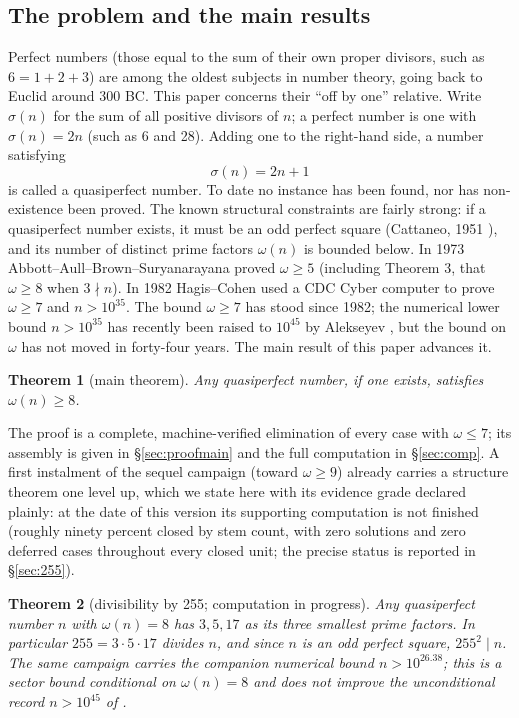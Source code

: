\documentclass[11pt]{article}
\newtheorem{theorem}{Theorem}
\theoremstyle{remark}
\begin{document}
\subsection{The problem and the main results}

Perfect numbers (those equal to the sum of their own proper divisors, such as $6 = 1 + 2 + 3$) are among the oldest subjects in number theory, going back to Euclid around 300 BC. This paper concerns their ``off by one'' relative. Write $\sigma(n)$ for the sum of all positive divisors of $n$; a perfect number is one with $\sigma(n) = 2n$ (such as 6 and 28). Adding one to the right-hand side, a number satisfying
\[ \sigma(n) = 2n + 1
\] is called a quasiperfect number. To date no instance has been found, nor has non-existence been proved. The known structural constraints are fairly strong: if a quasiperfect number exists, it must be an odd perfect square (Cattaneo, 1951 \cite{cattaneo}), and its number of distinct prime factors $\omega(n)$ is bounded below. In 1973 Abbott--Aull--Brown--Suryanarayana \cite{abbott} proved $\omega \ge 5$ (including Theorem 3, that $\omega \ge 8$ when $3 \nmid n$). In 1982 Hagis--Cohen \cite{hagiscohen} used a CDC Cyber computer to prove $\omega \ge 7$ and $n > 10^{35}$. The bound $\omega \ge 7$ has stood since 1982; the numerical lower bound $n > 10^{35}$ has recently been raised to $10^{45}$ by Alekseyev \cite{alekseyev}, but the bound on $\omega$ has not moved in forty-four years. The main result of this paper advances it.

\begin{theorem}[main theorem]\label{thm:main} Any quasiperfect number, if one exists, satisfies $\omega(n) \ge 8$.
\end{theorem}

The proof is a complete, machine-verified elimination of every case with $\omega \le 7$; its assembly is given in \S\ref{sec:proofmain} and the full computation in \S\ref{sec:comp}. A first instalment of the sequel campaign (toward $\omega \ge 9$) already carries a structure theorem one level up, which we state here with its evidence grade declared plainly: at the date of this version its supporting computation is not finished (roughly ninety percent closed by stem count, with zero solutions and zero deferred cases throughout every closed unit; the precise status is reported in \S\ref{sec:255}).

\begin{theorem}[divisibility by 255; computation in progress]\label{thm:255} Any quasiperfect number $n$ with $\omega(n) = 8$ has $3, 5, 17$ as its three smallest prime factors. In particular $255 = 3 \cdot 5 \cdot 17$ divides $n$, and since $n$ is an odd perfect square, $255^2 \mid n$. The same campaign carries the companion numerical bound $n > 10^{26.38}$; this is a sector bound conditional on $\omega(n) = 8$ and does not improve the unconditional record $n > 10^{45}$ of \cite{alekseyev}.
\end{theorem}
\end{document}

